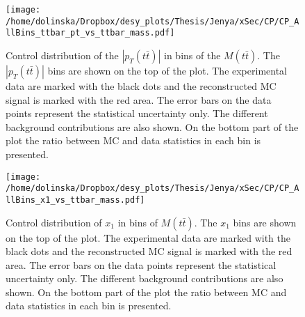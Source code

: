 \begin{figure}[p]
  \centering
  \texttt{[image: /home/dolinska/Dropbox/desy\_plots/Thesis/Jenya/xSec/CP/CP\_AllBins\_ttbar\_pt\_vs\_ttbar\_mass.pdf]}
  \caption{Control distribution of the $|p_{T}(t\bar{t})|$ in bins of the $M(t\bar{t})$. The $|p_{T}(t\bar{t})|$ bins are shown on the top 
  of the plot. The experimental data are marked with the black dots and the reconstructed MC signal is marked with the red area. The error
  bars on the data points represent the statistical uncertainty only. The 
  different background contributions are also shown. On the bottom part of the plot the ratio between MC and data statistics in each bin
  is presented.}
  \label{fig:CP_2D_pttt_Mtt}
\end{figure}


\begin{figure}[p]
  \centering
  \texttt{[image: /home/dolinska/Dropbox/desy\_plots/Thesis/Jenya/xSec/CP/CP\_AllBins\_x1\_vs\_ttbar\_mass.pdf]}
  \caption{Control distribution of $x_{1}$ in bins of $M(t\bar{t})$. The $x_{1}$ bins are shown on the top 
  of the plot. The experimental data are marked with the black dots and the reconstructed MC signal is marked with the red area. The error
  bars on the data points represent the statistical uncertainty only. The 
  different background contributions are also shown. On the bottom part of the plot the ratio between MC and data statistics in each bin
  is presented.}
  \label{fig:CP_2D_Mtt_x1}
\end{figure}


